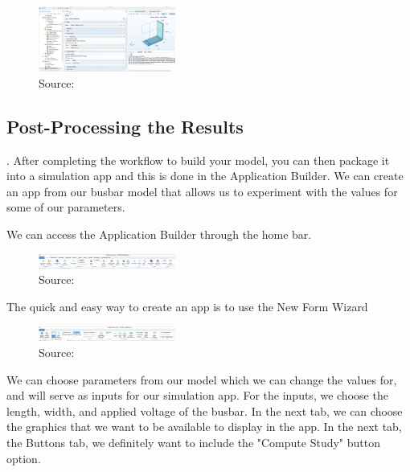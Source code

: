 \begin{figure}[ht!]
  \centering
  \includegraphics[width=0.4\textwidth]{Chapters/Figures/Chapter 3 Figures/Computed Results.png}
  \caption{Source: \cite{}}
  \label{}
\end{figure}

\subsection{Post-Processing the Results}.
After completing the workflow to build your model, you can then package it into a simulation app and this is done in the Application Builder. We can create an app from our busbar model that allows us to experiment with the values for some of our parameters.

We can access the Application Builder through the home bar.

\begin{figure}[ht!]
  \centering
  \includegraphics[width=0.4\textwidth]{Chapters/Figures/Chapter 3 Figures/Application Builder Button.png}
  \caption{Source: \cite{}}
  \label{}
\end{figure}

The quick and easy way to create an app is to use the New Form Wizard

\begin{figure}[ht!]
  \centering
  \includegraphics[width=0.4\textwidth]{Chapters/Figures/Chapter 3 Figures/New Form Wizard Button.png}
  \caption{Source: \cite{}}
  \label{}
\end{figure}

We can choose parameters from our model which we can change the values for, and will serve as inputs for our simulation app. For the inputs, we choose the length, width, and applied voltage of the busbar. In the next tab, we can choose the graphics that we want to be available to display in the app. In the next tab, the Buttons tab, we definitely want to include the "Compute Study" button option.

